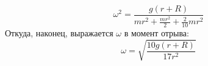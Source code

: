 \documentclass[a5paper,10pt]{article}
\begin{document}
\begin{equation}
	\omega^2=\frac{g(r+R)}{mr^2+\frac{mr^2}{2}+\frac{2}{10}mr^2}
\end{equation}
Откуда, наконец, выражается $\omega$  в момент отрыва:
\begin{equation}
	\omega=\sqrt{\frac{10g(r+R)}{17r^2}}
\end{equation}

\end{document}
